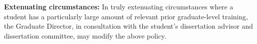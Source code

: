 \vspace{2mm}
\noindent
\textbf{Extenuating circumstances:} In truly extenuating circumstances
where a student has a particularly large amount of relevant prior
graduate-level training, the Graduate Director, in consultation with
the student’s dissertation advisor and dissertation committee, may
modify the above policy.


